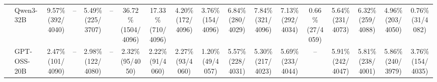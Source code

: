 \begin{table}[t]
{\begin{tabular}{ll*{16}{c}}
 & Qwen3-32B & \makecell[c]{9.57\%\\[-1pt]\scriptsize(392/4040)} & -- & \makecell[c]{5.49\%\\[-1pt]\scriptsize(225/3707)} & -- & \makecell[c]{36.72\%\\[-1pt]\scriptsize(1504/4096)} & \makecell[c]{17.33\%\\[-1pt]\scriptsize(710/4096)} & \makecell[c]{4.20\%\\[-1pt]\scriptsize(172/4096)} & \makecell[c]{3.76\%\\[-1pt]\scriptsize(154/4096)} & \makecell[c]{6.84\%\\[-1pt]\scriptsize(280/4029)} & \makecell[c]{7.84\%\\[-1pt]\scriptsize(321/4096)} & \makecell[c]{7.13\%\\[-1pt]\scriptsize(292/4034)} & \makecell[c]{0.66\%\\[-1pt]\scriptsize(27/4059)} & \makecell[c]{5.64\%\\[-1pt]\scriptsize(231/4073)} & \makecell[c]{6.32\%\\[-1pt]\scriptsize(259/4088)} & \makecell[c]{4.96\%\\[-1pt]\scriptsize(203/4050)} & \makecell[c]{0.76\%\\[-1pt]\scriptsize(31/4082)} \\
 & GPT-OSS-20B & \makecell[c]{2.47\%\\[-1pt]\scriptsize(101/4090)} & -- & \makecell[c]{2.98\%\\[-1pt]\scriptsize(122/4080)} & -- & \makecell[c]{2.32\%\\[-1pt]\scriptsize(95/4050)} & \makecell[c]{2.22\%\\[-1pt]\scriptsize(91/4060)} & \makecell[c]{2.27\%\\[-1pt]\scriptsize(93/4060)} & \makecell[c]{1.20\%\\[-1pt]\scriptsize(49/4057)} & \makecell[c]{5.57\%\\[-1pt]\scriptsize(228/4031)} & \makecell[c]{5.30\%\\[-1pt]\scriptsize(217/4023)} & \makecell[c]{5.69\%\\[-1pt]\scriptsize(233/4044)} & -- & \makecell[c]{5.91\%\\[-1pt]\scriptsize(242/4047)} & \makecell[c]{5.81\%\\[-1pt]\scriptsize(238/4001)} & \makecell[c]{5.86\%\\[-1pt]\scriptsize(240/3979)} & \makecell[c]{3.76\%\\[-1pt]\scriptsize(154/4035)} \\

\end{tabular}}
\end{table}
